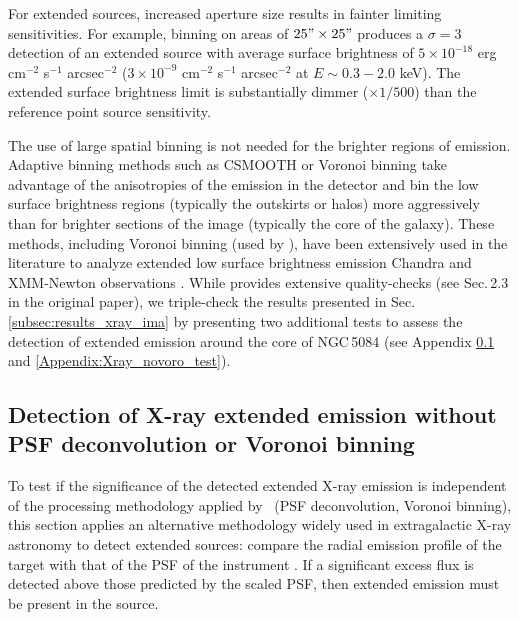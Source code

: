 \documentclass[modern]{CORE-AAS/aastex631}
\begin{document}
{For extended sources, increased aperture size results in fainter limiting sensitivities. For example, binning on areas of $25"\times25"$ produces a $\sigma=3$ detection of an extended source with average surface brightness of $5\times10^{-18}$ erg cm$^{-2}$ s$^{-1}$ arcsec$^{-2}$ ($3\times10^{-9}$ cm$^{-2}$ s$^{-1}$ arcsec$^{-2}$ at $E\sim0.3-2.0$ keV). The extended surface brightness limit is substantially dimmer ($\times1/500$) than the reference point source sensitivity.

The use of large spatial binning is not needed for the brighter regions of emission. Adaptive binning methods such as CSMOOTH \citep{ebeling+2006mnras368_65} or Voronoi binning \citep{cappellari+2003mnras342_345, diehl+2006mnras368_497} take advantage of the anisotropies of the emission in the detector and bin the low surface brightness regions (typically the outskirts or halos) more aggressively than for brighter sections of the image (typically the core of the galaxy). These methods, including Voronoi binning (used by \SAUNAS), have been extensively used in the literature to analyze extended low surface brightness emission Chandra and XMM-Newton observations \citep[see ][and references therein]{ebeling+2007apj661_33,gonzalezmartin+2009aap506_1107,broos+2010apj714_1582, ebeling+2010mnras407_83, xue+2011apj195_10, hodgeskluck+2012apj746_167, wang+2024apj962_188}. While \citet[][\SAUNAS\, I]{borlaff+2024apj967_169} provides extensive quality-checks (see Sec.\,2.3 in the original paper), we triple-check the results presented in Sec.\,\ref{subsec:results_xray_ima} by presenting two additional tests to assess the detection of extended emission around the core of NGC\,5084 (see Appendix \ref{Appendix:Xray_noPSFdeco_test} and \ref{Appendix:Xray_novoro_test}).


\subsection{Detection of X-ray extended emission without PSF deconvolution or Voronoi binning}
\label{Appendix:Xray_noPSFdeco_test}

To test if the significance of the detected extended X-ray emission is independent of the processing methodology applied by \SAUNAS\ (PSF deconvolution, Voronoi binning), this section applies an alternative methodology widely used in extragalactic X-ray astronomy to detect extended sources: compare the radial emission profile of the target with that of the PSF of the instrument \citep{fabbiano+2017apj842_4,fabbiano+2018apj855_131, jones+2020apj891_133,ma+2020apj900_164,ma+2023apj948_61}. If a significant excess flux is detected above those predicted by the scaled PSF, then extended emission must be present in the source.

}
\end{document}
